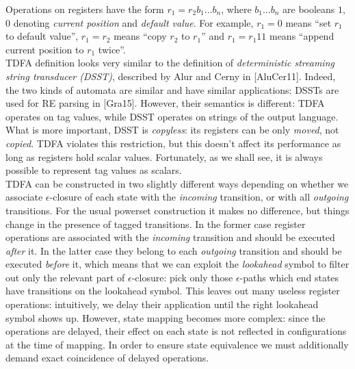\documentclass{article}
\newcommand{\Xeq}{\!=\!}
\theoremstyle{definition}
\begin{document}
\begin{multicols}{2}
Operations on registers have the form $r_1 \Xeq r_2 b_1 \dots b_n$, where $b_1 \dots b_n$ are booleans 
$1$, $0$ denoting \emph{current position} and \emph{default value}.
For example, $r_1 \Xeq 0$ means ``set $r_1$ to default value'',
$r_1 \Xeq r_2$ means ``copy $r_2$ to $r_1$'' and
$r_1 \Xeq r_1 1 1$ means ``append current position to $r_1$ twice''.
\\

TDFA definition looks very similar to the definition of
\emph{deterministic streaming string transducer (DSST)}, described by Alur and Cerny in [AluCer11].
Indeed, the two kinds of automata are similar and have similar applications: DSSTs are used for RE parsing in [Gra15].
However, their semantics is different: TDFA operates on tag values, while DSST operates on strings of the output language.
What is more important, DSST is \emph{copyless}:
its registers can be only \emph{moved}, not \emph{copied}.
TDFA violates this restriction, but this doesn't affect its performance as long as registers hold scalar values.
Fortunately, as we shall see, it is always possible to represent tag values as scalars.
\\

TDFA can be constructed in two slightly different ways
depending on whether we associate $\epsilon$-closure of each state with the \emph{incoming} transition,
or with all \emph{outgoing} transitions.
For the usual powerset construction it makes no difference, but things change in the presence of tagged transitions.
In the former case register operations are associated with the \emph{incoming} transition and should be executed \emph{after} it.
In the latter case they belong to each \emph{outgoing} transition and should be executed \emph{before} it,
which means that we can exploit the \emph{lookahead} symbol to filter out only the relevant part of $\epsilon$-closure:
pick only those $\epsilon$-paths which end states have transitions on the lookahead symbol.
This leaves out many useless register operations:
intuitively, we delay their application until the right lookahead symbol shows up.
However, state mapping becomes more complex:
since the operations are delayed,
their effect on each state is not reflected in configurations at the time of mapping.
In order to ensure state equivalence we must additionally demand exact coincidence of delayed operations.
\\


\end{multicols}
\end{document}

